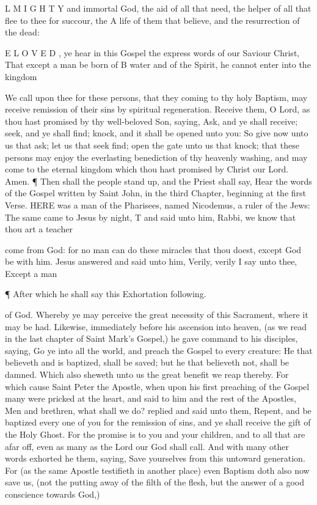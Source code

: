 L M I G H T Y and immortal God, the aid of all that need, the helper of all that flee to thee for succour, the A life of them that believe, and the resurrection of the dead:

E L O V E D , ye hear in this Gospel the express words of our Saviour Christ, That except a man be born of B water and of the Spirit, he cannot enter into the kingdom

We call upon thee for these persons, that they coming to thy holy Baptism, may receive remission of their sins by spiritual regeneration. Receive them, O Lord, as thou hast promised by thy well-beloved Son, saying, Ask, and ye shall receive; seek, and ye shall find; knock, and it shall be opened unto you: So give now unto us that ask; let us that seek find; open the gate unto us that knock; that these persons may enjoy the everlasting benediction of thy heavenly washing, and may come to the eternal kingdom which thou hast promised by Christ our Lord. Amen. ¶ Then shall the people stand up, and the Priest shall say, Hear the words of the Gospel written by Saint John, in the third Chapter, beginning at the first Verse. HERE was a man of the Pharisees, named Nicodemus, a ruler of the Jews: The same came to Jesus by night, T and said unto him, Rabbi, we know that thou art a teacher

come from God: for no man can do these miracles that thou doest, except God be with him. Jesus answered and said unto him, Verily, verily I say unto thee, Except a man

¶ After which he shall say this Exhortation following.

of God. Whereby ye may perceive the great necessity of this Sacrament, where it may be had. Likewise, immediately before his ascension into heaven, (as we read in the last chapter of Saint Mark’s Gospel,) he gave command to his disciples, saying, Go ye into all the world, and preach the Gospel to every creature: He that believeth and is baptized, shall be saved; but he that believeth not, shall be damned. Which also sheweth unto us the great benefit we reap thereby. For which cause Saint Peter the Apostle, when upon his first preaching of the Gospel many were pricked at the heart, and said to him and the rest of the Apostles, Men and brethren, what shall we do? replied and said unto them, Repent, and be baptized every one of you for the remission of sins, and ye shall receive the gift of the Holy Ghost. For the promise is to you and your children, and to all that are afar off, even as many as the Lord our God shall call. And with many other words exhorted he them, saying, Save yourselves from this untoward generation. For (as the same Apostle testifieth in another place) even Baptism doth also now save us, (not the putting away of the filth of the flesh, but the answer of a good conscience towards God,)

